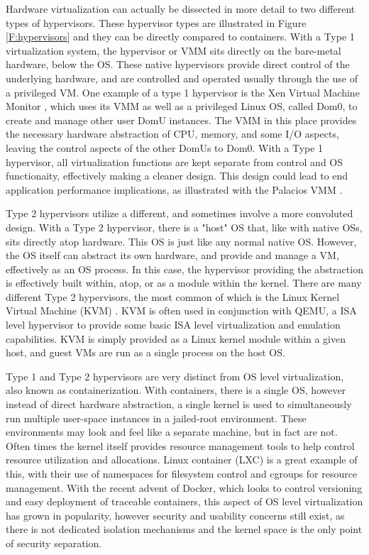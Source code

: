 Hardware virtualization can actually be dissected in more detail to two different types of hypervisors. These hypervisor types are illustrated in Figure \ref{F:hypervisors} and they can be directly compared to containers. With a Type 1 virtualization system, the hypervisor or VMM sits directly on the bare-metal hardware, below the OS. These native hypervisors provide direct control of the underlying hardware, and are controlled and operated usually through the use of a privileged VM.  One example of a type 1 hypervisor is the Xen Virtual Machine Monitor \cite{Barham2003}, which uses its VMM as well as a privileged Linux OS, called Dom0, to create and manage other user DomU instances. The VMM in this place provides the necessary hardware abstraction of CPU, memory, and some I/O aspects, leaving the control aspects of the other DomUs to Dom0.  With a Type 1 hypervisor, all virtualization functions are kept separate from control and OS functionaity, effectively making a cleaner design.  This design could lead to end application performance implications, as illustrated with the Palacios VMM \cite{lange2010palacios}. 

Type 2 hypervisors utilize a different, and sometimes involve a more convoluted design. With a Type 2 hypervisor, there is a "host" OS that, like with native OSs, sits directly atop hardware. This OS is just like any normal native OS. However, the OS itself can abstract its own hardware, and provide and manage a VM, effectively as an OS process.  In this case, the hypervisor providing the abstraction is effectively built within, atop, or as a module within the kernel.  There are many different Type 2 hypervisors, the most common of which is the Linux Kernel Virtual Machine (KVM) \cite{kivity2007kvm}. KVM is often used in conjunction with QEMU, a ISA level hypervisor to provide some basic ISA level virtualization and emulation capabilities. KVM is simply provided as a Linux kernel module within a given host, and guest VMs are run as a single process on the host OS.  
 
Type 1 and Type 2 hypervisors are very distinct from OS level virtualization, also known as containerization. With containers, there is a single OS, however instead of direct hardware abstraction, a single kernel is used to simultaneously run multiple user-space instances in a jailed-root environment. These environments may look and feel like a separate machine, but in fact are not. Often times the kernel itself provides resource management tools to help control resource utilization and allocations. Linux container (LXC) is a great example of this, with their use of namespaces for filesystem control and cgroups for resource management. With the recent advent of Docker, which looks to control versioning and easy deployment of traceable containers, this aspect of OS level virtualization has grown in popularity, however security and usability concerns still exist, as there is not dedicated isolation mechanisms and the kernel space is the only point of security separation.   


